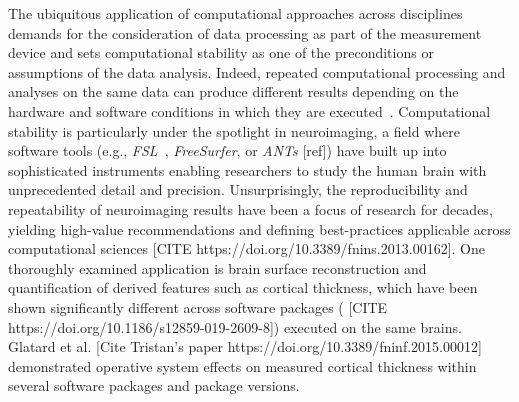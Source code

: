\documentclass[lettersize,journal]{IEEEtran}
\begin{document}
The ubiquitous application of computational approaches across disciplines
  demands for the consideration of data processing as part of the measurement device
  and sets computational stability as one of the preconditions or assumptions of the data analysis.
Indeed, repeated computational processing and analyses on the same data can produce different results
  depending on the hardware and software conditions in which they are executed~\cite{gronenschild2012effects}.
Computational stability is particularly under the spotlight in neuroimaging,
  a field where software tools (e.g., \emph{FSL}~\cite{jenkinson2012fsl},
  \emph{FreeSurfer}\cite{fischl2012freesurfer}, or {\color{red} \emph{ANTs} [ref]}) %
  have built up into sophisticated instruments enabling researchers 
  to study the human brain with unprecedented detail and precision.
Unsurprisingly, the reproducibility and repeatability of neuroimaging results have been a focus of research for decades,
  yielding high-value recommendations and defining best-practices applicable across
  computational sciences {\color{red} [CITE https://doi.org/10.3389/fnins.2013.00162]}.
One thoroughly examined application is brain surface reconstruction and quantification of derived features such
  as cortical thickness, which have been shown significantly different across
  software packages ({\color{red} [CITE https://doi.org/10.1186/s12859-019-2609-8]})
  executed on the same brains.
Glatard et al. {\color{red} [Cite Tristan's paper https://doi.org/10.3389/fninf.2015.00012]}
  demonstrated operative system effects on measured cortical thickness within several software packages
  and package versions.
%
\end{document}

